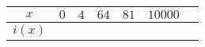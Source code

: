 {\begin{multicols}{2}
\begin{center}
\begin{tabular}{|c|c|c|c|c|c|c|}
	\hline
\end{tabular}
\end{center}
	\begin{center}
\begin{tabular}{|c|c|c|c|c|c|c|}
	\hline
	\cellcolor{gray!40} $x$& $0$ & $4$ & $64$&$81$&$10000$\\
	\hline
	\cellcolor{gray!40} $i(x)$&\hspace{0.9cm}\phantom{t}&\hspace{0.9cm}\phantom{t}&\hspace{0.9cm}\phantom{t}&\hspace{0.9cm}\phantom{t} &\hspace{0.9cm}\phantom{t} \\
	\hline
\end{tabular}
\end{center}
\endgroup
    \end{multicols}

}

